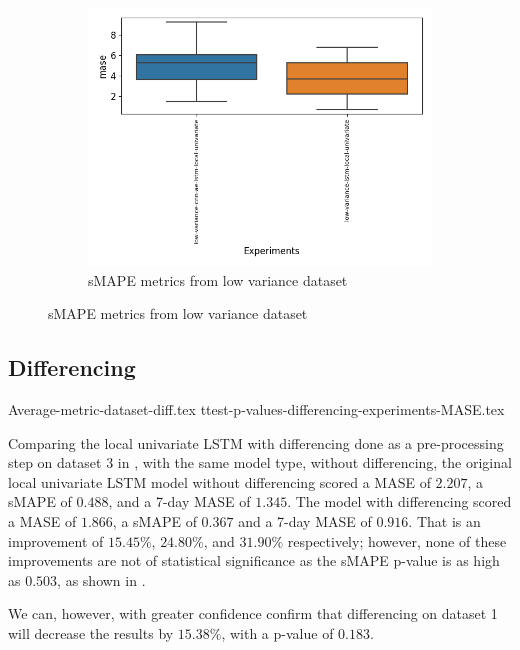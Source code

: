\begin{figure}[h!]
\begin{subfigure}[b]{0.49\textwidth}
  \end{subfigure}
  \begin{subfigure}[b]{0.49\textwidth}
    \includegraphics[width=\textwidth]{./figs/results/boxplot/mase-dataset_low_variance.png}
    \hfill
    \caption{sMAPE metrics from low variance dataset}

  \end{subfigure}
  \label{fig:results:boxplot-dataset-variance}
\end{figure}

\subsection{Differencing}
{Average-metric-dataset-diff.tex}
{ttest-p-values-differencing-experiments-MASE.tex}






Comparing the local univariate LSTM with differencing done as a pre-processing step
on dataset 3 in ,
with the same model type, without differencing,
the original local univariate LSTM model without differencing scored a MASE of
$2.207$, a sMAPE of $0.488$, and a 7-day MASE of $1.345$.
The model with differencing scored a MASE of $1.866$, a sMAPE of $0.367$ and a 7-day MASE of
$0.916$. That is an improvement of $15.45\%$, $24.80\%$, and $31.90\%$ respectively; however,
none of these improvements are not of statistical significance as the sMAPE p-value is as high as $0.503$,
as shown in .

We can, however, with greater confidence confirm that differencing on dataset 1 will decrease
the results by $15.38\%$, with a p-value of $0.183$.